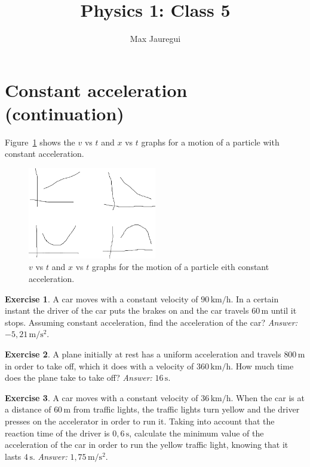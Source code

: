 \documentclass[12pt,a4paper]{article}
\title{Physics 1: Class 5}
\author{Max Jauregui}
\theoremstyle{definition}
\newtheorem{ex}{Exercise}[section]
\begin{document}
\maketitle

\section{Constant acceleration (continuation)}

Figure~\ref{fig:mruv} shows the $v$ vs $t$ and $x$ vs $t$ graphs for a motion of a particle with constant acceleration.

\begin{figure}[ht]
  \centering
  \includegraphics[width=0.5\textwidth,keepaspectratio]{figures/mruv.pdf}
  \caption{$v$ vs $t$ and $x$ vs $t$ graphs for the motion of a particle eith constant acceleration.}
  \label{fig:mruv}
\end{figure}

\begin{ex}
  A car moves with a constant velocity of $90\,\mathrm{km/h}$. In a
  certain instant the driver of the car puts the brakes on and the car
  travels $60\,\mathrm{m}$ until it stops. Assuming constant
  acceleration, find the acceleration of the car? \emph{Answer:}
  $-5{,}21\,\mathrm{m/s^2}$.
\end{ex}

\begin{ex}
  A plane initially at rest has a uniform acceleration and travels
  $800\,\mathrm{m}$ in order to take off, which it does with a
  velocity of $360\,\mathrm{km/h}$. How much time does the plane take
  to take off? \emph{Answer:} $16\,\mathrm{s}$.
\end{ex}

\begin{ex}
  A car moves with a constant velocity of $36\,\mathrm{km/h}$. When
  the car is at a distance of $60\,\mathrm{m}$ from traffic lights,
  the traffic lights turn yellow and the driver presses on the
  accelerator in order to run it. Taking into account that the
  reaction time of the driver is $0{,}6\,\mathrm{s}$, calculate the
  minimum value of the acceleration of the car in order to run the
  yellow traffic light, knowing that it lasts $4\,\mathrm{s}$. \emph{Answer:} $1{,}75\,\mathrm{m/s^2}$.
\end{ex}
\end{document}
